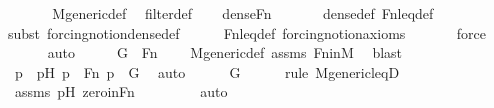 \begin{isabellebody}
%
\isadelimproof
%
\endisadelimproof
%
\isatagproof
{}\isamarkupfalse%
\ {\isacharminus}{\kern0pt}\ \isanewline
\ \ \isamarkupfalse%
\ M{\isacharunderscore}{\kern0pt}generic{\isacharunderscore}{\kern0pt}def\isanewline
\ \ filter{\isacharunderscore}{\kern0pt}def\isanewline
\isanewline
\ \ \isamarkupfalse%
\ {\isachardoublequoteopen}dense{\isacharparenleft}{\kern0pt}Fn{\isacharparenright}{\kern0pt}{\isachardoublequoteclose}\ \isanewline
\ \ \ \ \isamarkupfalse%
\ dense{\isacharunderscore}{\kern0pt}def\ Fn{\isacharunderscore}{\kern0pt}leq{\isacharunderscore}{\kern0pt}def\isanewline
\ \ \ \ \isamarkupfalse%
{\isacharparenleft}{\kern0pt}subst\ forcing{\isacharunderscore}{\kern0pt}notion{\isachardot}{\kern0pt}dense{\isacharunderscore}{\kern0pt}def{\isacharparenright}{\kern0pt}\isanewline
\ \ \ \ \isamarkupfalse%
\ Fn{\isacharunderscore}{\kern0pt}leq{\isacharunderscore}{\kern0pt}def\ forcing{\isacharunderscore}{\kern0pt}notion{\isacharunderscore}{\kern0pt}axioms\isanewline
\ \ \ \ \ \isamarkupfalse%
\ force\isanewline
\ \ \ \ \isamarkupfalse%
\ auto\isanewline
\isanewline
\ \ \isamarkupfalse%
\ \isamarkupfalse%
\ {\isachardoublequoteopen}G\ {\isasyminter}\ Fn\ {\isasymnoteq}\ {}{\isachardoublequoteclose}\ \isamarkupfalse%
\ M{\isacharunderscore}{\kern0pt}generic{\isacharunderscore}{\kern0pt}def\ assms\ Fn{\isacharunderscore}{\kern0pt}in{\isacharunderscore}{\kern0pt}M\ \isamarkupfalse%
\ blast\isanewline
\ \ \isamarkupfalse%
\ \isamarkupfalse%
\ p\ \ pH{\isacharcolon}{\kern0pt}\ {\isachardoublequoteopen}p\ {\isasymin}\ Fn{\isachardoublequoteclose}\ {\isachardoublequoteopen}p\ {\isasymin}\ G{\isachardoublequoteclose}\ \isamarkupfalse%
\ auto\isanewline
\isanewline
\ \ \isamarkupfalse%
\ {\isachardoublequoteopen}{}\ {\isasymin}\ G{\isachardoublequoteclose}\ \isanewline
\ \ \ \ \isamarkupfalse%
{\isacharparenleft}{\kern0pt}rule\ M{\isacharunderscore}{\kern0pt}generic{\isacharunderscore}{\kern0pt}leqD{\isacharparenright}{\kern0pt}\isanewline
\ \ \ \ \isamarkupfalse%
\ assms\ pH\ zero{\isacharunderscore}{\kern0pt}in{\isacharunderscore}{\kern0pt}Fn\isanewline
\ \ \ \ \ \ \ \isamarkupfalse%
\ auto{\isacharbrackleft}{\kern0pt}{}{\isacharbrackright}{\kern0pt}\isanewline
\ \ \ \ \isamarkupfalse%

\end{isabellebody}

